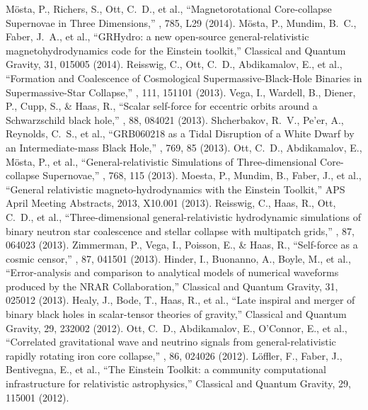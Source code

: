  M{\"o}sta, P., Richers, S., Ott, C.~D., et al., ``Magnetorotational Core-collapse Supernovae in Three Dimensions,'' \apjl, 785, L29 (2014).
 M{\"o}sta, P., Mundim, B.~C., Faber, J.~A., et al., ``GRHydro: a new open-source general-relativistic magnetohydrodynamics code for the Einstein toolkit,'' Classical and Quantum Gravity, 31, 015005 (2014).
 Reisswig, C., Ott, C.~D., Abdikamalov, E., et al., ``Formation and Coalescence of Cosmological Supermassive-Black-Hole Binaries in Supermassive-Star Collapse,'' \prl, 111, 151101 (2013).
 Vega, I., Wardell, B., Diener, P., Cupp, S., \& Haas, R., ``Scalar self-force for eccentric orbits around a Schwarzschild black hole,'' \prd, 88, 084021 (2013).
 Shcherbakov, R.~V., Pe'er, A., Reynolds, C.~S., et al., ``GRB060218 as a Tidal Disruption of a White Dwarf by an Intermediate-mass Black Hole,'' \apj, 769, 85 (2013).
 Ott, C.~D., Abdikamalov, E., M{\"o}sta, P., et al., ``General-relativistic Simulations of Three-dimensional Core-collapse Supernovae,'' \apj, 768, 115 (2013).
 Moesta, P., Mundim, B., Faber, J., et al., ``General relativistic magneto-hydrodynamics with the Einstein Toolkit,'' APS April Meeting Abstracts, 2013, X10.001 (2013).
 Reisswig, C., Haas, R., Ott, C.~D., et al., ``Three-dimensional general-relativistic hydrodynamic simulations of binary neutron star coalescence and stellar collapse with multipatch grids,'' \prd, 87, 064023 (2013).
 Zimmerman, P., Vega, I., Poisson, E., \& Haas, R., ``Self-force as a cosmic censor,'' \prd, 87, 041501 (2013).
 Hinder, I., Buonanno, A., Boyle, M., et al., ``Error-analysis and comparison to analytical models of numerical waveforms produced by the NRAR Collaboration,'' Classical and Quantum Gravity, 31, 025012 (2013).
 Healy, J., Bode, T., Haas, R., et al., ``Late inspiral and merger of binary black holes in scalar-tensor theories of gravity,'' Classical and Quantum Gravity, 29, 232002 (2012).
 Ott, C.~D., Abdikamalov, E., O'Connor, E., et al., ``Correlated gravitational wave and neutrino signals from general-relativistic rapidly rotating iron core collapse,'' \prd, 86, 024026 (2012).
 L{\"o}ffler, F., Faber, J., Bentivegna, E., et al., ``The Einstein Toolkit: a community computational infrastructure for relativistic astrophysics,'' Classical and Quantum Gravity, 29, 115001 (2012).
